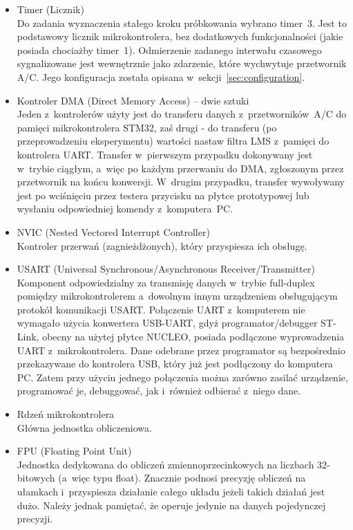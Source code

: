 \begin{enumerate}
\begin{itemize}
		\item Timer (Licznik)\\
		Do zadania wyznaczenia stałego kroku próbkowania wybrano timer~3. Jest to podstawowy licznik mikrokontrolera, bez dodatkowych funkcjonalności (jakie posiada chociażby timer~1). Odmierzenie zadanego interwału czasowego sygnalizowane jest wewnętrznie jako zdarzenie, które wychwytuje przetwornik A/C. Jego konfiguracja została opisana w~sekcji~\ref{sec:configuration}.
		\item Kontroler DMA (Direct Memory Access) -- dwie sztuki\\
		Jeden z~kontrolerów użyty jest do transferu danych z~przetworników~A/C do pamięci mikrokontrolera STM32, zaś drugi - do transferu (po przeprowadzeniu eksperymentu) wartości nastaw filtra LMS z~pamięci do kontrolera UART. Transfer w~pierwszym przypadku dokonywany jest w~trybie ciągłym, a~więc po każdym przerwaniu do DMA, zgłoszonym przez przetwornik na końcu konwersji. W~drugim przypadku, transfer wywoływany jest po wciśnięciu przez testera przycisku na płytce prototypowej lub wysłaniu odpowiedniej komendy z~komputera~PC.
		\item NVIC (Nested Vectored Interrupt Controller)\\
		Kontroler przerwań (zagnieżdżonych), który przyspiesza ich obsługę.
		\item USART (Universal Synchronous/Asynchronous Receiver/Transmitter)\\
		Komponent odpowiedzialny za transmisję danych w~trybie full-duplex pomiędzy mikrokontrolerem a~dowolnym innym urządzeniem obsługującym protokół komunikacji USART. Połączenie UART z~komputerem nie wymagało użycia konwertera USB-UART, gdyż programator/debugger ST-Link, obecny na użytej płytce NUCLEO, posiada podłączone wyprowadzenia UART z~mikrokontrolera. Dane odebrane przez programator są bezpośrednio przekazywane do kontrolera USB, który już jest podłączony do komputera PC. Zatem przy użyciu jednego połączenia można zarówno zasilać urządzenie, programować je, debuggować, jak i~również odbierać z~niego dane.
		\item Rdzeń mikrokontrolera\\
		Główna jednostka obliczeniowa.
		\item FPU (Floating Point Unit)\\
		Jednostka dedykowana do obliczeń zmiennoprzecinkowych na liczbach 32-bitowych (a~więc typu float). Znacznie podnosi precyzję obliczeń na ułamkach i~przyspiesza działanie całego układu jeżeli takich działań jest dużo. Należy jednak pamiętać, że operuje jedynie na danych pojedynczej precyzji. 

\end{itemize}
\end{enumerate}
